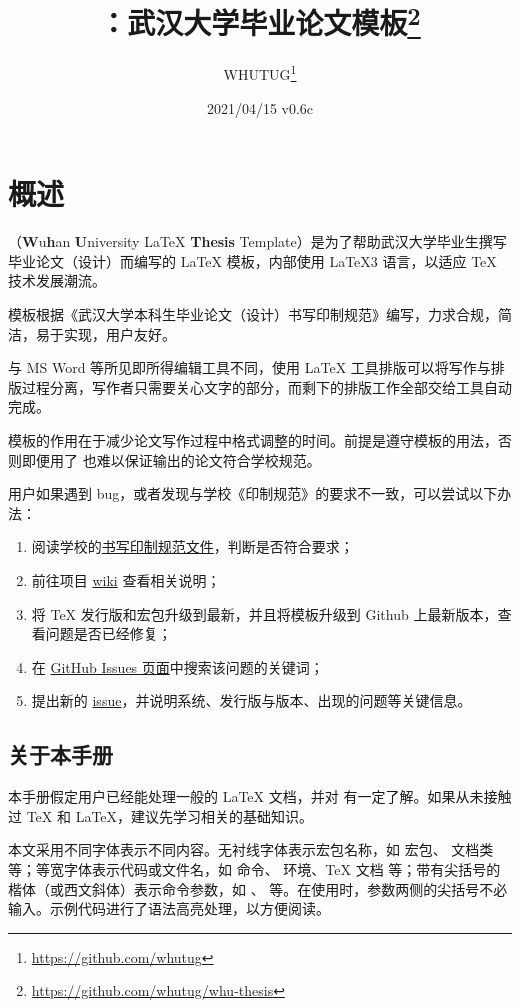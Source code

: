 \documentclass{fdudoc}
\title{\cls{whu-thesis}\bfseries ：武汉大学毕业论文模板\thanks{\url{https://github.com/whutug/whu-thesis}}}
\author{WHUTUG\thanks{\url{https://github.com/whutug}}}
\date{2021/04/15 \quad v0.6c}
\begin{document}
\maketitle
\tableofcontents

\section{概述}
（\textbf{W}u\textbf{h}an \textbf{U}niversity \LaTeX{} \textbf{Thesis} Template）是为了帮助武汉大学毕业生撰写毕业论文（设计）而编写的 \LaTeX{} 模板，内部使用 \LaTeX3 语言，以适应 \TeX{} 技术发展潮流。

模板根据《武汉大学本科生毕业论文（设计）书写印制规范》编写，力求合规，简洁，易于实现，用户友好。

与 MS Word 等所见即所得编辑工具不同，使用 \LaTeX{} 工具排版可以将写作与排版过程分离，写作者只需要关心文字的部分，而剩下的排版工作全部交给工具自动完成。

模板的作用在于减少论文写作过程中格式调整的时间。前提是遵守模板的用法，否则即便用了  也难以保证输出的论文符合学校规范。

用户如果遇到 bug，或者发现与学校《印制规范》的要求不一致，可以尝试以下办法：
\begin{enumerate}
    \item 阅读学校的\href{https://github.com/mtobeiyf/whu-thesis/files/4638713/default.pdf}{书写印制规范文件}，判断是否符合要求；
    \item 前往项目 \href{https://github.com/mtobeiyf/whu-thesis/wiki}{wiki} 查看相关说明；
    \item 将 \TeX{} 发行版和宏包升级到最新，并且将模板升级到 Github 上最新版本，查看问题是否已经修复；
    \item 在 \href{https://github.com/mtobeiyf/whu-thesis/issues}{GitHub Issues 页面}中搜索该问题的关键词；
    \item 提出新的 \href{https://github.com/mtobeiyf/whu-thesis/issues}{issue}，并说明系统、发行版与版本、出现的问题等关键信息。
\end{enumerate}

\subsection*{关于本手册}
本手册假定用户已经能处理一般的 \LaTeX{} 文档，并对 \BibTeX{} 有一定了解。如果从未接触过 \TeX{} 和 \LaTeX{}，建议先学习相关的基础知识。

本文采用不同字体表示不同内容。无衬线字体表示宏包名称，如  宏包、 文档类等；等宽字体表示代码或文件名，如  命令、 环境、\TeX{} 文档  等；带有尖括号的楷体（或西文斜体）表示命令参数，如 、 等。在使用时，参数两侧的尖括号不必输入。示例代码进行了语法高亮处理，以方便阅读。
\end{document}
